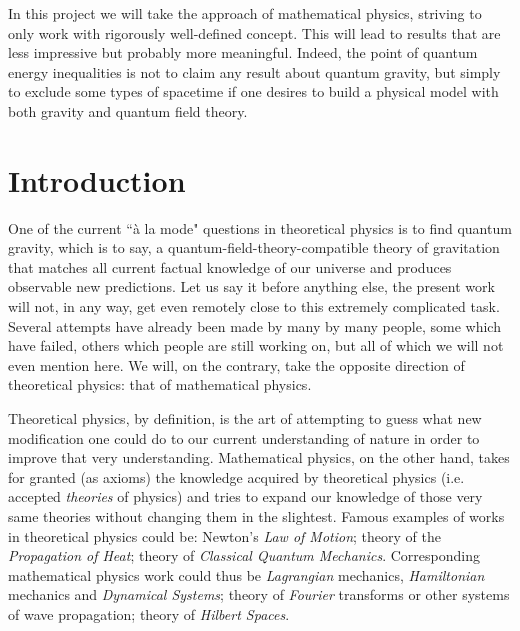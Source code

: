 \documentclass[a4paper,11pt]{article}
\numberwithin{equation}{section}
\theoremstyle{definition}
\begin{document}
In this project we will take the approach of mathematical physics, striving to only work with rigorously well-defined concept. This will lead to results that are less impressive but probably more meaningful. Indeed, the point of quantum energy inequalities is not to claim any result about quantum gravity, but simply to exclude some types of spacetime if one desires to build a physical model with both gravity and quantum field theory. 

\addtocounter{section}{-1}
\section{Introduction}
One of the current ``à la mode" questions in theoretical physics is to find quantum gravity, which is to say, a quantum-field-theory-compatible theory of gravitation that matches all current factual knowledge of our universe and produces observable new predictions.
Let us say it before anything else, the present work will not, in any way, get even remotely close to this extremely complicated task. Several attempts have already been made by many by many people, some which have failed, others which people are still working on, but all of which we will not even mention here. 
We will, on the contrary, take the opposite direction of theoretical physics: that of mathematical physics.

Theoretical physics, by definition, is the art of attempting to guess what new modification one could do to our current understanding of nature in order to improve that very understanding. Mathematical physics, on the other hand, takes for granted (as axioms) the knowledge acquired by theoretical physics (i.e. accepted \emph{theories} of physics) and tries to expand our knowledge of those very same theories without changing them in the slightest. Famous examples of works in theoretical physics could be: Newton's \textit{Law of Motion}; theory of the \textit{Propagation of Heat}; theory of \textit{Classical Quantum Mechanics}. Corresponding mathematical physics work could thus be \textit{Lagrangian} mechanics, \textit{Hamiltonian} mechanics and \textit{Dynamical Systems}; theory of \textit{Fourier} transforms or other systems of wave propagation; theory of \textit{Hilbert Spaces}.
\end{document}
